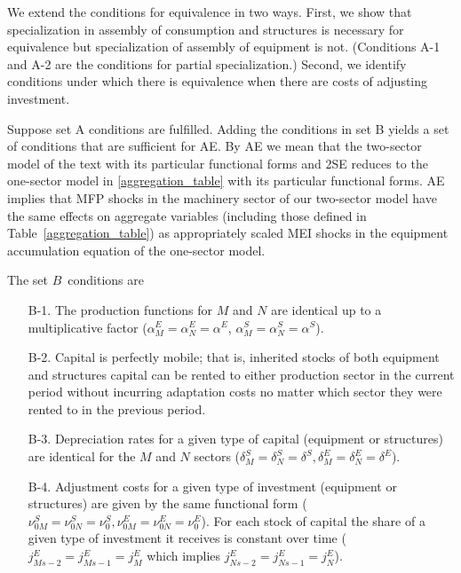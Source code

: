 \documentclass[12pt,fleqn]{article}
\begin{document}
We extend the conditions for equivalence in two ways. First, we show that
specialization in assembly of consumption and structures is necessary for
equivalence but specialization of assembly of equipment is not. (Conditions
A-1 and A-2 are the conditions for partial specialization.) Second, we
identify conditions under which there is equivalence when there are costs of
adjusting investment.

Suppose set A conditions are fulfilled. Adding the conditions in set B
yields a set of conditions that are sufficient for AE. By AE we mean that
the two-sector model of the text with its particular functional forms and
2SE reduces to the one-sector model in \ref{aggregation_table} with its
particular functional forms. AE implies that MFP shocks in the machinery
sector of our two-sector model have the same effects on aggregate variables
(including those defined in Table~\ref{aggregation_table}) as appropriately
scaled MEI shocks in the equipment accumulation equation of the one-sector
model.

The set $B$\ conditions are
\begin{enumerate}
\item[B-1.] The production functions for $M$ and $N$ are identical up to a
multiplicative factor ($\alpha _{M}^{E}=\alpha _{N}^{E}=\alpha ^{E}$, $%
\alpha _{M}^{S}=\alpha _{N}^{S}=\alpha ^{S}$).

\item[B-2.] Capital is perfectly mobile; that is, inherited stocks of both
equipment and structures capital can be rented to either production sector
in the current period without incurring adaptation costs no matter which
sector they were rented to in the previous period.

\item[B-3.] Depreciation rates for a given type of capital (equipment or
structures) are identical for the $M$ and $N$ sectors ($\delta_M^S=%
\delta_N^S=\delta^S, \delta_M^E=\delta_N^E=\delta^E$).

\item[B-4.] Adjustment costs for a given type of investment (equipment or
structures) are given by the same functional form ($\nu
_{0M}^S=\nu_{0N}^S=\nu_0^S, \nu _{0M}^E=\nu_{0N}^E=\nu_0^E$). For each stock
of capital the share of a given type of investment it receives is constant
over time ($j_{Ms-2}^{E}=j_{Ms-1}^{E}=j_{M}^{E}$ which implies $%
j_{Ns-2}^{E}=j_{Ns-1}^{E}=j_{N}^{E}$).
\end{enumerate}
\end{document}
